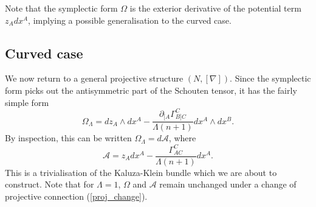 Note that the symplectic form $\Omega$ is the exterior derivative
of the potential term $z_{A}{d}x^{A}$, implying a possible
generalisation to the curved case.


\subsection{Curved case}

We now return to a general projective structure $(N,[\nabla])$. Since the
symplectic form picks out the antisymmetric part of the Schouten tensor,
it has the fairly simple form
\[
\Omega_{\Lambda}={d}z_{A}\wedge{d}x^{A}-\frac{\partial_{[A}\Gamma_{B]C}^{C}}{\Lambda(n+1)}{d}x^{A}\wedge{d}x^{B}.
\]
By inspection, this can be written $\Omega_{\Lambda}={d}\mathcal{A}$,
where
\[
\mathcal{A}=z_{A}{d}x^{A}-\frac{\Gamma_{AC}^{C}}{\Lambda(n+1)}{d}x^{A}.
\]
This is a trivialisation of the Kaluza-Klein bundle which we are about
to construct. Note that for $\Lambda=1$, $\Omega$ and
$\mathcal{A}$ remain unchanged under a change of projective connection (\ref{proj_change}).

